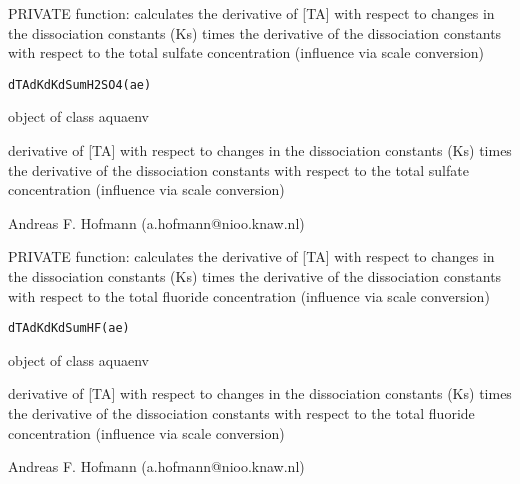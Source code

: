 \documentclass{article}
\begin{document}
\begin{Description}\relax
PRIVATE function: calculates the derivative of [TA] with respect to changes in the dissociation constants (Ks) times the derivative of the dissociation constants with respect to the total sulfate concentration (influence via scale conversion)
\end{Description}
\begin{Usage}
\begin{verbatim}dTAdKdKdSumH2SO4(ae)\end{verbatim}
\end{Usage}
\begin{Arguments}
\begin{ldescription}
\item[\code{ae }] object of class aquaenv
\end{ldescription}
\end{Arguments}
\begin{Value}
derivative of [TA] with respect to changes in the dissociation constants (Ks) times the derivative of the dissociation constants with respect to the total sulfate concentration (influence via scale conversion)
\end{Value}
\begin{Author}\relax
Andreas F. Hofmann (a.hofmann@nioo.knaw.nl)
\end{Author}

\begin{Description}\relax
PRIVATE function: calculates the derivative of [TA] with respect to changes in the dissociation constants (Ks) times the derivative of the dissociation constants with respect to the total fluoride concentration (influence via scale conversion)
\end{Description}
\begin{Usage}
\begin{verbatim}dTAdKdKdSumHF(ae)\end{verbatim}
\end{Usage}
\begin{Arguments}
\begin{ldescription}
\item[\code{ae }] object of class aquaenv
\end{ldescription}
\end{Arguments}
\begin{Value}
derivative of [TA] with respect to changes in the dissociation constants (Ks) times the derivative of the dissociation constants with respect to the total fluoride concentration (influence via scale conversion)
\end{Value}
\begin{Author}\relax
Andreas F. Hofmann (a.hofmann@nioo.knaw.nl)
\end{Author}
\end{document}
